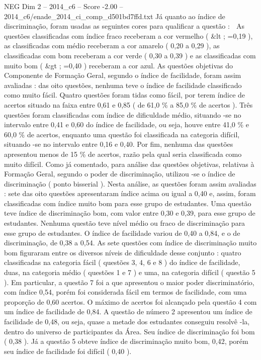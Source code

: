 \begin{textsample}{NEG Dim 2 – 2014\_c6 – Score -2.00 – 2014\_c6/enade\_2014\_ci\_comp\_d501bd7ffd.txt}
Já quanto ao índice de discriminação, foram usadas as seguintes cores para qualificar a questão :  As questões classificadas com índice fraco receberam a cor vermelho ( \&lt ; =0,19 ), as classificadas com médio receberam a cor amarelo ( 0,20 a 0,29 ), as classificadas com bom receberam a cor verde ( 0,30 a 0,39 ) e as classificadas com muito bom ( \&gt ; =0,40 ) receberam a cor azul.
As questões objetivas do Componente de Formação Geral, segundo o índice de facilidade, foram assim avaliadas : das oito questões, nenhuma teve o índice de facilidade classificado como muito fácil.
Quatro questões foram tidas como fácil, por terem índice de acertos situado na faixa entre 0,61 e 0,85 ( de 61,0 \% a 85,0 \% de acertos ).
Três questões foram classificadas com índice de dificuldade médio, situando -se no intervalo entre 0,41 e 0,60 do índice de facilidade, ou seja, houve entre 41,0 \% e 60,0 \% de acertos, enquanto uma questão foi classificada na categoria difícil, situando -se no intervalo entre 0,16 e 0,40.
Por fim, nenhuma das questões apresentou menos de 15 \% de acertos, razão pela qual seria classificada como muito difícil.
Como já comentado, para análise das questões objetivas, relativas à Formação Geral, segundo o poder de discriminação, utilizou -se o índice de discriminação ( ponto bisserial ).
Nesta análise, as questões foram assim avaliadas : sete das oito questões apresentaram índice acima ou igual a 0,40 e, assim, foram classificadas com índice muito bom para esse grupo de estudantes.
Uma questão teve índice de discriminação bom, com valor entre 0,30 e 0,39, para esse grupo de estudantes.
Nenhuma questão teve nível médio ou fraco de discriminação para esse grupo de estudantes.
O índice de facilidade variou de 0,40 a 0,84, e o de discriminação, de 0,38 a 0,54.
As sete questões com índice de discriminação muito bom figuraram entre os diversos níveis de dificuldade desse conjunto : quatro classificadas na categoria fácil ( questões 3, 4, 6 e 8 ) do índice de facilidade, duas, na categoria médio ( questões 1 e 7 ) e uma, na categoria difícil ( questão 5 ).
Em particular, a questão 7 foi a que apresentou o maior poder discriminatório, com índice 0,54, porém foi considerada fácil em termos de facilidade, com uma proporção de 0,60 acertos.
O máximo de acertos foi alcançado pela questão 4 com um índice de facilidade de 0,84.
A questão de número 2 apresentou um índice de facilidade de 0,48, ou seja, quase a metade dos estudantes conseguiu resolvê -la, dentro do universo de participantes da Área.
Seu índice de discriminação foi bom ( 0,38 ).
Já a questão 5 obteve índice de discriminação muito bom, 0,42, porém seu índice de facilidade foi difícil ( 0,40 ).

\end{textsample}

